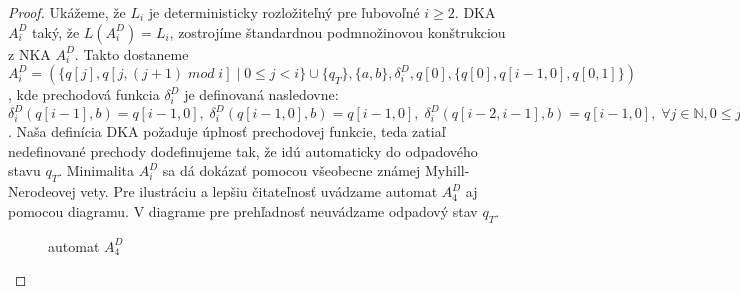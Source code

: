 \begin{proof}
\par
Ukážeme, že $ L_i $ je deterministicky rozložiteľný pre ľubovoľné $ i \geq 2 $. DKA $ A_i^D $ taký, že $ L(A_i^D)=L_i $, zostrojíme štandardnou podmnožinovou konštrukciou z NKA $ A_i^D $. Takto dostaneme $ A_i^D = (\lbrace q[j],q[j,(j+1) \; mod \; i] \; | \; 0 \leq j < i \rbrace \cup \lbrace q_T \rbrace,\lbrace a,b \rbrace, \delta_i^D, q[0], \lbrace q[0], q[i-1,0],q[0,1] \rbrace) $, kde prechodová funkcia $ \delta_i^D $ je definovaná nasledovne: $ \delta_i^D(q[i-1],b) = q[i-1,0], \; \delta_i^D(q[i-1,0],b) = q[i-1,0], \; \delta_i^D(q[i-2,i-1],b) = q[i-1,0] , \; \forall j \in \mathbb{N}, 0 \leq j < i : \delta_i^D(q[j],a) = q[(j+1) \; mod \; i], \delta_i^D(q[j,(j+1) \; mod \; i],a) = q[(j+1) \; mod \; i, (((j+1) \; mod \; i)+1)  \; mod \; i] $. Naša definícia DKA požaduje úplnosť prechodovej funkcie, teda zatiaľ nedefinované prechody dodefinujeme tak, že idú automaticky do odpadového stavu $ q_T $. Minimalita $ A_i^D $ sa dá dokázať pomocou všeobecne známej Myhill-Nerodeovej vety. Pre ilustráciu a lepšiu čitateľnosť uvádzame automat $ A_4^D $ aj pomocou diagramu. V diagrame pre prehľadnosť neuvádzame odpadový stav $ q_T $.

\begin{figure}[H]
\centering
{}
\caption{automat $ A_4^D $}
\end{figure}


\end{proof}
